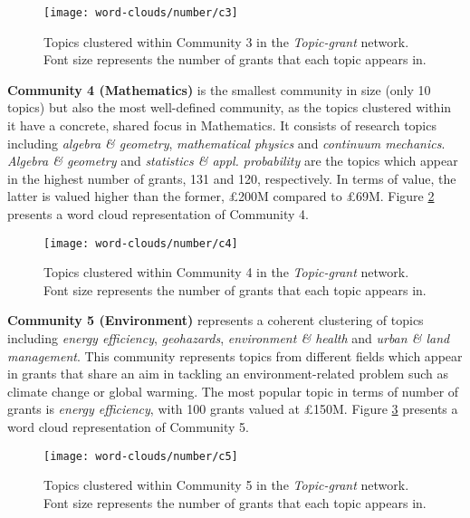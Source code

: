 \clearpage

\begin{figure}[!htbp]
    \centering
    \texttt{[image: word-clouds/number/c3]}
    \caption[Topics clustered within Community 3 in the \textit{Topic-grant} network]{Topics clustered within Community 3 in the \textit{Topic-grant} network. Font size represents the number of grants that each topic appears in.}
    \label{figure:topic_a_current_number_c3}
\end{figure}

\noindent\textbf{Community 4 (Mathematics)} is the smallest community in size (only 10 topics) but also the most well-defined community, as the topics clustered within it have a concrete, shared focus in Mathematics. It consists of research topics including \textit{algebra \& geometry}, \textit{mathematical physics} and \textit{continuum mechanics}. \textit{Algebra \& geometry} and \textit{statistics \& appl. probability} are the topics which appear in the highest number of grants, 131 and 120, respectively. In terms of value, the latter is valued higher than the former, \pounds200M compared to \pounds69M. Figure \ref{figure:topic_a_current_number_c4} presents a word cloud representation of Community 4.

\begin{figure}[!htbp]
    \centering
    \texttt{[image: word-clouds/number/c4]}
    \caption[Topics clustered within Community 4 in the \textit{Topic-grant} network]{Topics clustered within Community 4 in the \textit{Topic-grant} network. Font size represents the number of grants that each topic appears in.}
    \label{figure:topic_a_current_number_c4}
\end{figure}

\noindent\textbf{Community 5 (Environment)} represents a coherent clustering of topics including \textit{energy efficiency}, \textit{geohazards}, \textit{environment \& health} and \textit{urban \& land management}. This community represents topics from different fields which appear in grants that share an aim in tackling an environment-related problem such as climate change or global warming. The most popular topic in terms of number of grants is \textit{energy efficiency}, with 100 grants valued at \pounds150M. Figure \ref{figure:topic_a_current_number_c5} presents a word cloud representation of Community 5.

\begin{figure}[!htbp]
    \centering
    \texttt{[image: word-clouds/number/c5]}
    \caption[Topics clustered within Community 5 in the \textit{Topic-grant} network]{Topics clustered within Community 5 in the \textit{Topic-grant} network. Font size represents the number of grants that each topic appears in.}
    \label{figure:topic_a_current_number_c5}
\end{figure}

